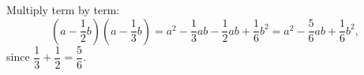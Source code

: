 Multiply term by term:
\[
\left(a-\dfrac{1}{2}b\right)\left(a-\dfrac{1}{3}b\right)=a^2-\dfrac{1}{3}ab-\dfrac{1}{2}ab+\dfrac{1}{6}b^2=\boxed{a^2-\dfrac{5}{6}ab+\dfrac{1}{6}b^2},
\]
since $\dfrac{1}{3}+\dfrac{1}{2}=\dfrac{5}{6}$.
